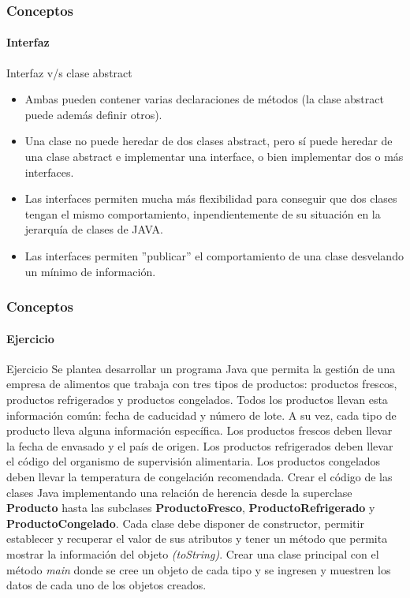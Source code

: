 \documentclass{beamer}
\begin{document}
		\begin{frame}
			\frametitle{Conceptos}
			\framesubtitle{Interfaz}

			\begin{block}{Interfaz v/s clase abstract}
				\begin{itemize}
  					\item Ambas pueden contener varias declaraciones de m\'etodos (la clase abstract puede adem\'as definir otros).
					\item Una clase no puede heredar de dos clases abstract, pero s\'i puede heredar de una clase abstract e implementar una interface, o bien implementar dos o m\'as interfaces.
					\item Las interfaces permiten mucha m\'as flexibilidad para conseguir que dos clases tengan el mismo comportamiento, inpendientemente de su situaci\'on en la jerarqu\'ia de clases de JAVA.
					\item Las interfaces permiten ''publicar'' el comportamiento de una clase desvelando un m\'inimo de informaci\'on.
				\end{itemize}
			\end{block}
		\end{frame}

		\begin{frame}
			\frametitle{Conceptos}
			\framesubtitle{Ejercicio}

			\begin{exampleblock}{Ejercicio}
			{\scriptsize
				Se plantea desarrollar un programa Java que permita la gesti\'on de una empresa de alimentos que trabaja con tres tipos de productos: productos frescos, productos refrigerados y productos congelados. Todos los productos llevan esta informaci\'on com\'un: fecha de caducidad y n\'umero de lote. A su vez, cada tipo de producto lleva alguna informaci\'on espec\'ifica. Los productos frescos deben llevar la fecha de envasado y el pa\'is de origen. Los productos refrigerados deben llevar el c\'odigo del organismo de supervisi\'on alimentaria. Los productos congelados deben llevar la temperatura de congelaci\'on recomendada. Crear el c\'odigo de las clases Java implementando una relaci\'on de herencia desde la superclase \textbf{Producto} hasta las subclases \textbf{ProductoFresco}, \textbf{ProductoRefrigerado} y \textbf{ProductoCongelado}. Cada clase debe disponer de constructor, permitir establecer y recuperar el valor de sus atributos y tener un m\'etodo que permita mostrar la informaci\'on del objeto \emph{(toString)}. Crear una clase principal con el m\'etodo \emph{main} donde se cree un objeto de cada tipo y se ingresen y muestren los datos de cada uno de los objetos creados.}
			\end{exampleblock}
		\end{frame}
\end{document}
